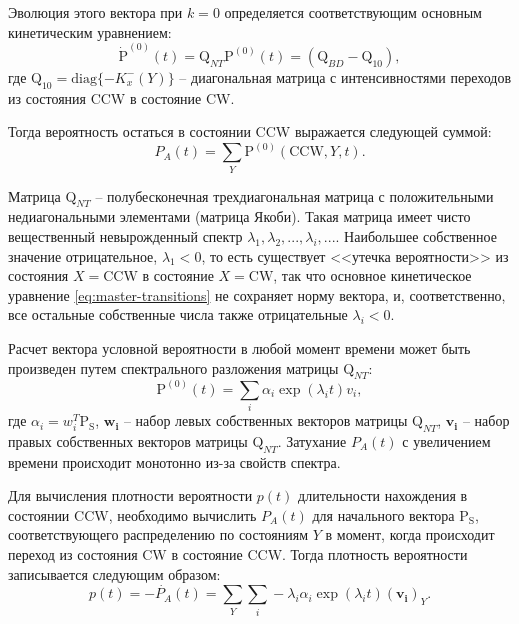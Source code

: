 Эволюция этого вектора при $k=0$ определяется соответствующим основным кинетическим уравнением:
\begin{equation}
    \dot{\boldsymbol{\mathrm{P}}}^{(0)}(t)=\boldsymbol{\mathrm{Q}}_{NT}\mathrm{P}^{(0)}(t) = \left (\boldsymbol{\mathrm{Q}}_{BD} - \boldsymbol{\mathrm{Q}}_{10} \right ),
    \label{eq:conditioned-master-transtions}
\end{equation}
где $\boldsymbol{\mathrm{Q}}_{10} = \mathrm{diag}\{-K^-_x(Y)\}$ -- диагональная матрица с интенсивностями переходов из состояния CCW в состояние CW.

Тогда вероятность остаться в состоянии CCW выражается следующей суммой:
\begin{equation}
    P_A(t) = \sum_Y \mathrm{P}^{(0)}(\mathrm{CCW},Y,t).
    \label{eq:no-transition-prob}
\end{equation}

Матрица $\boldsymbol{\mathrm{Q}}_{NT}$ -- полубесконечная трехдиагональная матрица с положительными недиагональными элементами (матрица Якоби). Такая матрица имеет чисто вещественный невырожденный спектр ${\lambda_1, \lambda_2, ..., \lambda_i, ...}$. Наибольшее собственное значение отрицательное, $\lambda_1 < 0$, то есть существует <<утечка вероятности>> из состояния $X = \mathrm{CCW}$ в состояние $X = \mathrm{CW}$, так что основное кинетическое уравнение \cref{eq:master-transitions} не сохраняет норму вектора, и, соответственно, все остальные собственные числа также отрицательные $\lambda_i < 0$. 

Расчет вектора условной вероятности в любой момент времени может быть произведен путем спектрального разложения матрицы $\boldsymbol{\mathrm{Q}}_{NT}$:
\begin{equation}
    \boldsymbol{\mathrm{P}}^{(0)}(t) = \sum_i \alpha_i \exp(\lambda_i t) v_i,
    \label{eq:solution-no-transition-prob}
\end{equation}
где $\alpha_i=w_i^T \boldsymbol{\mathrm{P_S}}$, $\boldsymbol{w_i}$ -- набор левых собственных векторов матрицы $\boldsymbol{\mathrm{Q}}_{NT}$, $\boldsymbol{v_i}$ -- набор правых собственных векторов матрицы $\boldsymbol{\mathrm{Q}}_{NT}$. Затухание $P_A(t)$ с увеличением времени происходит монотонно из-за свойств спектра.

Для вычисления плотности вероятности $p(t)$ длительности нахождения в состоянии CCW, необходимо вычислить $P_A(t)$ для начального вектора $\boldsymbol{\mathrm{P_S}}$, соответствующего распределению по состояниям $Y$ в момент, когда происходит переход из состояния CW в состояние CCW.
Тогда плотность вероятности записывается следующим образом:
\begin{equation}
    p(t) = -\dot{P_A}(t) = \sum_Y \sum_i -\lambda_i \alpha_i \exp(\lambda_i t) (\boldsymbol{v_i})_Y.
    \label{eq:solution-no-transition-pdf}
\end{equation}

